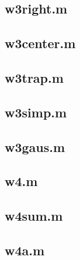 \documentclass[12pt,a4paper]{article}
\begin{document}
\subsection*{w3right.m}

\subsection*{w3center.m}

\subsection*{w3trap.m}

\subsection*{w3simp.m}

\subsection*{w3gaus.m}


\subsection*{w4.m}

\subsection*{w4sum.m}

\subsection*{w4a.m}

\end{document}
